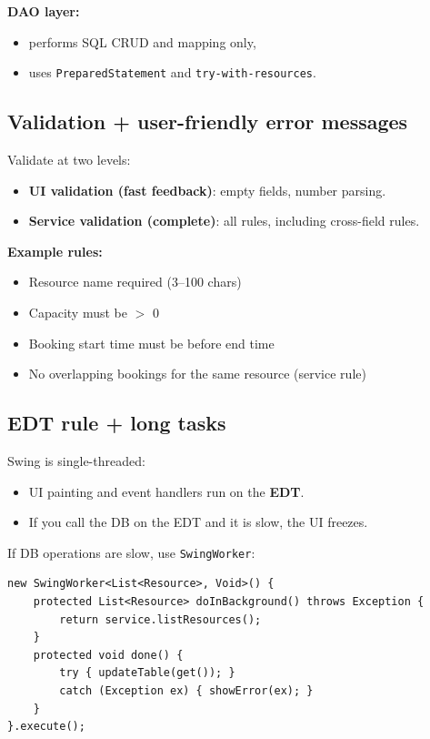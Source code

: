 \documentclass[11pt]{article}
\begin{document}
\textbf{DAO layer:}
\begin{itemize}
  \item performs SQL CRUD and mapping only,
  \item uses \texttt{PreparedStatement} and \texttt{try-with-resources}.
\end{itemize}

\subsection{Validation + user-friendly error messages}
Validate at two levels:
\begin{itemize}
  \item \textbf{UI validation (fast feedback)}: empty fields, number parsing.
  \item \textbf{Service validation (complete)}: all rules, including cross-field rules.
\end{itemize}

\textbf{Example rules:}
\begin{itemize}
  \item Resource name required (3--100 chars)
  \item Capacity must be $>$ 0
  \item Booking start time must be before end time
  \item No overlapping bookings for the same resource (service rule)
\end{itemize}

\subsection{EDT rule + long tasks}
Swing is single-threaded:
\begin{itemize}
  \item UI painting and event handlers run on the \textbf{EDT}.
  \item If you call the DB on the EDT and it is slow, the UI freezes.
\end{itemize}

If DB operations are slow, use \texttt{SwingWorker}:
\begin{lstlisting}
new SwingWorker<List<Resource>, Void>() {
    protected List<Resource> doInBackground() throws Exception {
        return service.listResources();
    }
    protected void done() {
        try { updateTable(get()); }
        catch (Exception ex) { showError(ex); }
    }
}.execute();
\end{lstlisting}
\end{document}
